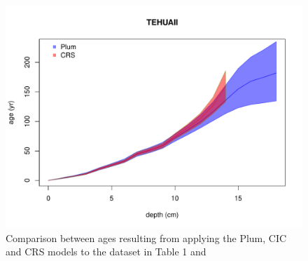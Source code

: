 \documentclass [10pt] {article}
\newcommand{\ac}{\color{red} }  %
\newcommand{\ca}{\color{black}} %
\begin{document}

\begin{figure}[h!]
 \centering
	\includegraphics[width=.75\linewidth]{TEHUAII-2.pdf}
	\caption{Comparison between ages resulting from applying the Plum, CIC and CRS  models to the dataset in Table 1 and \citet{Sanchez-Cabeza2012}} 
  \label{fig:tehuaii}
\end{figure}


\end{document}
